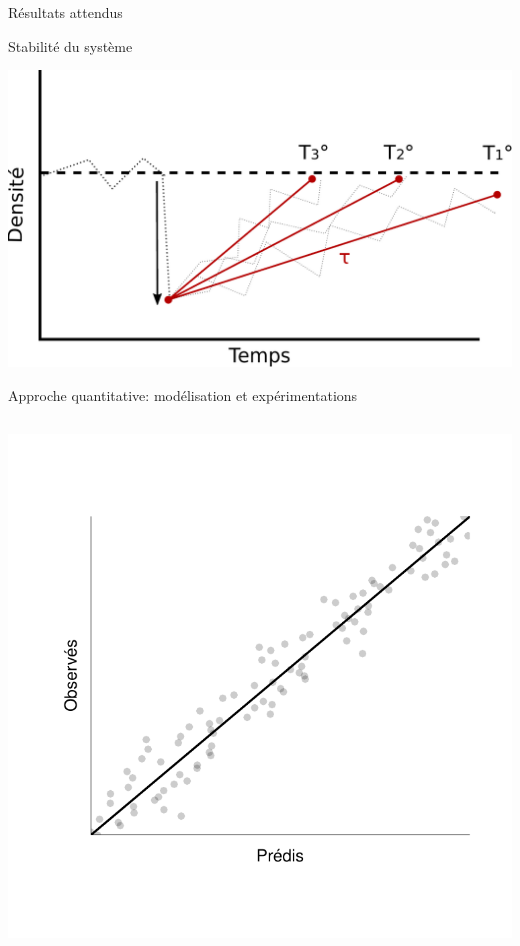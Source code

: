 \documentclass[11pt, compress, aspectratio=1610]{beamer}
\newcommand{\begincols}{\begin{columns}}
\newcommand{\stopcols}{\end{columns}}
\begin{document}
\begin{frame}{Résultats attendus}

\centering
Stabilité du système \par
\includegraphics[width=0.7\linewidth]{figuresAz/stabFinal.pdf}

\end{frame}

\begin{frame}{Approche quantitative: modélisation et expérimentations}

\begincols
  \centering
 \par
{}
\includegraphics[width=1.2\linewidth]{figuresAz/yx.pdf} \stopcols

\end{frame}
\end{document}
